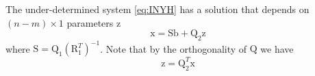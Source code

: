 \documentclass{scrartcl}
\newcommand\mMat[1]{\ensuremath{\boldsymbol{\mathrm{#1}}}}
\newcommand\mVec[1]{\ensuremath{\boldsymbol{\mathrm{#1}}}}
\begin{document}
The under-determined system \eqref{eq:INYH} has a solution that depends on
$(n-m) \times 1$ parameters $\mVec{z}$
\begin{equation}
  \mVec{x} = \mMat{S} \mVec{b} + \mMat{Q}_2 \mVec{z}
  \label{eq:1A2S}
\end{equation}
where $\mMat{S} = \mMat{Q}_1 \left( \mMat{R}_1^T \right)^{-1}$. Note that by
the orthogonality of $\mMat{Q}$ we have
\begin{equation}
  \mVec{z} = \mMat{Q}_2^T \mVec{x}
  \label{eq:36FN}
\end{equation}
\end{document}
